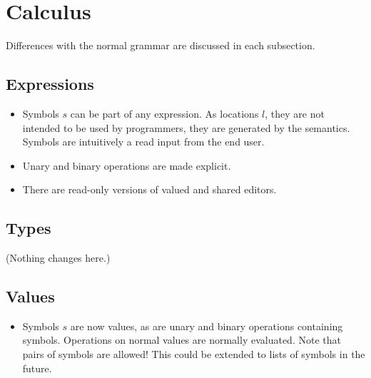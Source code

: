 

\section{Calculus}
\label{sec:language}

Differences with the normal grammar are discussed in each subsection.


\subsection{Expressions}


\begin{itemize}
  \item
    Symbols $s$ can be part of any expression.
    As locations $l$, they are not intended to be used by programmers,
    they are generated by the semantics.
    Symbols are intuitively a read input from the end user.
  \item
    Unary and binary operations are made explicit.
\end{itemize}


\begin{itemize}
  \item
    There are read-only versions of valued and shared editors.
\end{itemize}



\subsection{Types}


(Nothing changes here.)


\subsection{Values}


\begin{itemize}
  \item
    Symbols $s$ are now values,
    as are unary and binary operations containing symbols.
    Operations on normal values are normally evaluated.
    Note that pairs of symbols are allowed!
    This could be extended to lists of symbols in the future.
\end{itemize}

